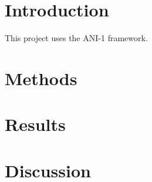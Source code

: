 \section{Introduction}
This project uses the ANI-1 framework. \cite{smith2017ani}

\lipsum[2]

\section{Methods}
\lipsum[3]

\section{Results}
\lipsum[4]

\section{Discussion}
\lipsum[5]

\printbibliography[heading=bibnumbered]
